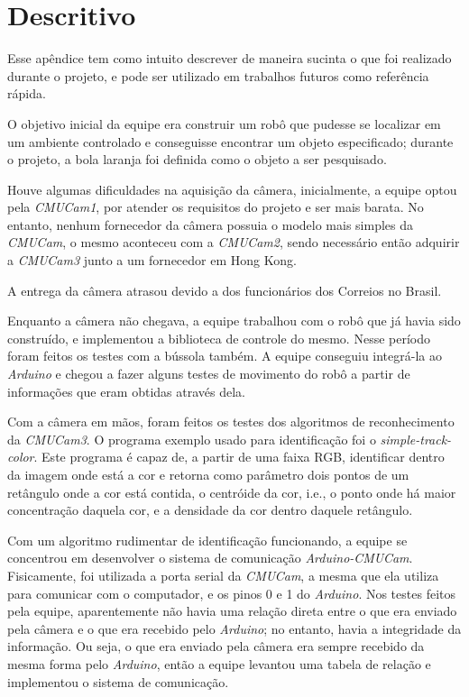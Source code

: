 \chapter{Descritivo}

Esse apêndice tem como intuito descrever de maneira sucinta o que foi realizado durante o projeto, e pode ser utilizado em trabalhos futuros como referência rápida.

O objetivo inicial da equipe era construir um robô que pudesse se localizar em um ambiente controlado e conseguisse encontrar um objeto especificado; durante o projeto, a bola laranja foi definida como o objeto a ser pesquisado.

Houve algumas dificuldades na aquisição da câmera, inicialmente, a equipe optou pela \textit{CMUCam1}, por atender os requisitos do projeto e ser mais barata. No entanto, nenhum fornecedor da câmera possuia o modelo mais simples da \textit{CMUCam}, o mesmo aconteceu com a \textit{CMUCam2}, sendo necessário então adquirir a \textit{CMUCam3} junto a um fornecedor em Hong Kong.

A entrega da câmera atrasou devido a dos funcionários dos Correios no Brasil.

Enquanto a câmera não chegava, a equipe trabalhou com o robô que já havia sido construído, e implementou a biblioteca de controle do mesmo. Nesse período foram feitos os testes com a bússola também. A equipe conseguiu integrá-la ao \textit{Arduino} e chegou a fazer alguns testes de movimento do robô a partir de informações que eram obtidas através dela.

Com a câmera em mãos, foram feitos os testes dos algoritmos de reconhecimento da \textit{CMUCam3}. O programa exemplo usado para identificação foi o \textit{simple-track-color}. Este programa é capaz de, a partir de uma faixa RGB, identificar dentro da imagem onde está a cor e retorna como parâmetro dois pontos de um retângulo onde a cor está contida, o centróide da cor, i.e., o ponto onde há maior concentração daquela cor, e a densidade da cor dentro daquele retângulo.

Com um algoritmo rudimentar de identificação funcionando, a equipe se concentrou em desenvolver o sistema de comunicação \textit{Arduino-CMUCam}. Fisicamente, foi utilizada a porta serial da \textit{CMUCam}, a mesma que ela utiliza para comunicar com o computador, e os pinos 0 e 1 do \textit{Arduino}. Nos testes feitos pela equipe, aparentemente não havia uma relação direta entre o que era enviado pela câmera e o que era recebido pelo \textit{Arduino}; no entanto, havia a integridade da informação. Ou seja, o que era enviado pela câmera era sempre recebido da mesma forma pelo \textit{Arduino}, então a equipe levantou uma tabela de relação e implementou o sistema de comunicação.

